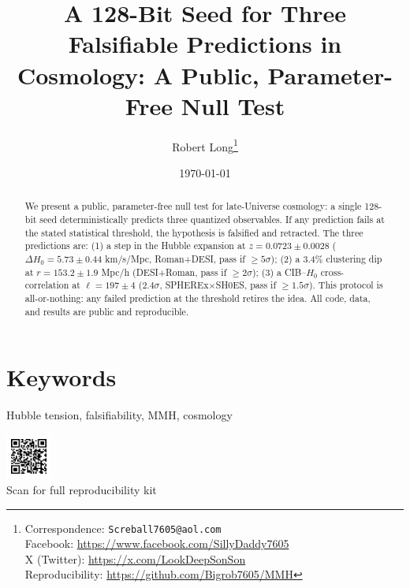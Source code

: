 \documentclass[11pt,a4paper]{article}
\title{
  \bfseries A 128-Bit Seed for Three Falsifiable Predictions in Cosmology: A Public, Parameter-Free Null Test
}
\author{
  Robert Long\thanks{
    Correspondence: \texttt{Screball7605@aol.com} \\
    Facebook: \url{https://www.facebook.com/SillyDaddy7605} \\
    X (Twitter): \url{https://x.com/LookDeepSonSon} \\
    Reproducibility: \url{https://github.com/Bigrob7605/MMH}
  }
}
\date{\today}
\begin{document}
\begin{titlepage}
\thispagestyle{empty}
\maketitle


\vspace{-1.5em}

\begin{abstract}
We present a public, parameter-free null test for late-Universe cosmology: a single 128-bit seed deterministically predicts three quantized observables. If any prediction fails at the stated statistical threshold, the hypothesis is falsified and retracted. The three predictions are: (1) a step in the Hubble expansion at $z = 0.0723 \pm 0.0028$ ($\Delta H_0 = 5.73 \pm 0.44$ km/s/Mpc, Roman+DESI, pass if $\geq 5\sigma$); (2) a 3.4\% clustering dip at $r = 153.2 \pm 1.9$ Mpc/h (DESI+Roman, pass if $\geq 2\sigma$); (3) a CIB--$H_0$ cross-correlation at $\ell = 197 \pm 4$ ($2.4\sigma$, SPHEREx$\times$SH0ES, pass if $\geq 1.5\sigma$). This protocol is all-or-nothing: any failed prediction at the threshold retires the idea. All code, data, and results are public and reproducible.
\end{abstract}

\begin{center}
\end{center}

\vspace{0.5em}
\section*{Keywords}
Hubble tension, falsifiability, MMH, cosmology
\end{titlepage}

\begin{center}
  \vspace{1em}
  \includegraphics[width=1.5cm]{figs/github_qr.png}\\
  \footnotesize Scan for full reproducibility kit
\end{center}
\end{document}
